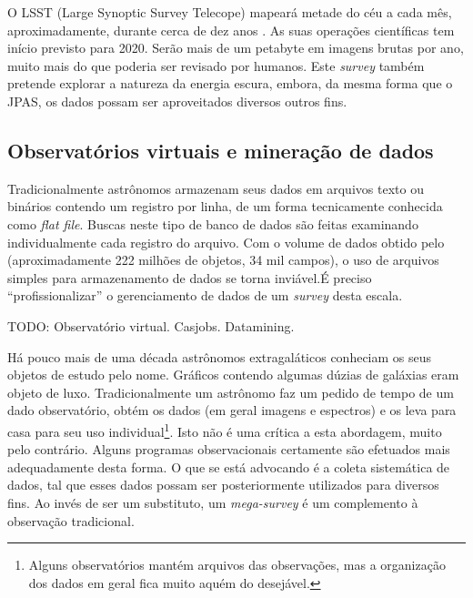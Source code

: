 O LSST (Large Synoptic Survey Telecope) mapeará metade do céu a cada mês,
aproximadamente, durante cerca de dez anos \citep{Ivezic2008}. As suas operações
científicas tem início previsto para 2020. Serão mais de um petabyte em imagens
brutas por ano, muito mais do que poderia ser revisado por humanos. Este {\em
survey} também pretende explorar a natureza da energia escura, embora, da mesma
forma que o JPAS, os dados possam ser aproveitados diversos outros fins.

\subsection{Observatórios virtuais e mineração de dados}

Tradicionalmente astrônomos armazenam seus dados em arquivos texto ou binários
contendo um registro por linha, de um forma tecnicamente conhecida como {\em
flat file}. Buscas neste tipo de banco de dados são feitas examinando
individualmente cada registro do arquivo. Com o volume de dados obtido pelo
\galex (aproximadamente 222 milhões de objetos, 34 mil campos)\citneed, o uso de
arquivos simples para armazenamento de dados se torna inviável.\citneed É
preciso ``profissionalizar'' o gerenciamento de dados de um {\em survey} desta
escala.

TODO: Observatório virtual. Casjobs. Datamining.

Há pouco mais de uma década astrônomos extragaláticos conheciam os seus objetos
de estudo pelo nome. Gráficos contendo algumas dúzias de galáxias eram objeto de
luxo. Tradicionalmente um astrônomo faz um pedido de tempo de um dado
observatório, obtém os dados (em geral imagens e espectros) e os leva para casa
para seu uso individual\footnote{Alguns observatórios mantém arquivos das
observações\citneed, mas a organização dos dados em geral fica muito aquém do
desejável.}. Isto não é uma crítica a esta abordagem, muito pelo contrário.
Alguns programas observacionais certamente são efetuados mais adequadamente
desta forma. O que se está advocando é a coleta sistemática de dados, tal que
esses dados possam ser posteriormente utilizados para diversos fins. Ao invés de
ser um substituto, um {\em mega-survey} é um complemento à observação
tradicional.





